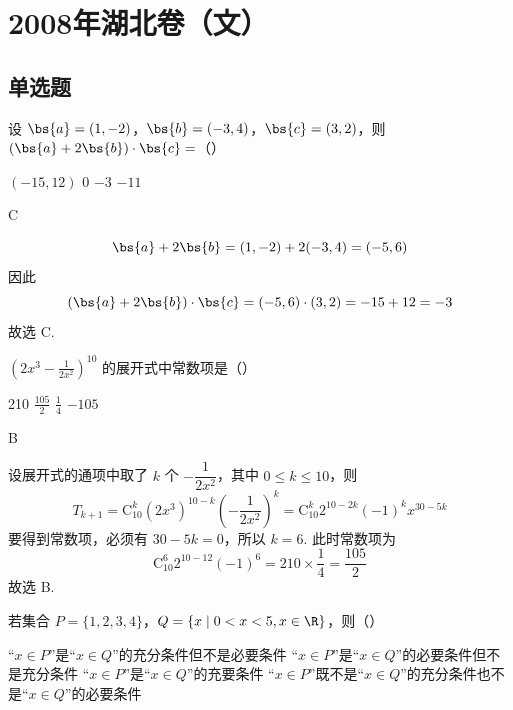\chapter{2008年湖北卷（文）}

\section{单选题}

\begin{problem}
设 \(\bs{a} = (1, -2)\)，\(\bs{b} = (-3, 4)\)，\(\bs{c} = (3, 2)\)，则 \((\bs{a} + 2\bs{b}) \cdot \bs{c} =\)（\quad）

\choices
    {\((-15, 12)\)}
    {0}
    {\(-3\)}
    {\(-11\)}
\end{problem}

\begin{answer}
C
\end{answer}

\begin{solution}
\[
\bs{a}+2\bs{b}=(1,-2)+2(-3,4)=(-5,6)
\]
因此
\[
(\bs{a}+2\bs{b})\cdot\bs{c}=(-5,6)\cdot(3,2)=-15+12=-3
\]
故选 C.
\end{solution}

\begin{problem}
\(\left(2x^{3} - \frac{1}{2x^{2}}\right)^{10}\) 的展开式中常数项是（\quad）

\choices
    {210}
    {\(\frac{105}{2}\)}
    {\(\frac{1}{4}\)}
    {\(-105\)}
\end{problem}

\begin{answer}
B
\end{answer}


\begin{solution}
设展开式的通项中取了 \(k\) 个 \(-\dfrac{1}{2x^2}\)，其中 \(0\leqslant k\leqslant10\)，则
\[
T_{k+1}=\mathrm C_{10}^{k}(2x^3)^{10-k}\left(-\frac{1}{2x^2}\right)^k
=\mathrm C_{10}^{k}2^{10-2k}(-1)^k x^{30-5k}
\]
要得到常数项，必须有 \(30-5k=0\)，所以 \(k=6\). 此时常数项为
\[
\mathrm C_{10}^{6}2^{10-12}(-1)^6
=210\times\frac{1}{4}=\frac{105}{2}
\]
故选 B.
\end{solution}

\begin{problem}
若集合 \(P = \{1, 2, 3, 4\}\)，\(Q = \{x \mid 0 < x < 5, x \in \R\}\)，则（\quad）

\choices
    {“\(x\in P\)”是“\(x\in Q\)”的充分条件但不是必要条件}
    {“\(x\in P\)”是“\(x\in Q\)”的必要条件但不是充分条件}
    {“\(x\in P\)”是“\(x\in Q\)”的充要条件}
    {“\(x\in P\)”既不是“\(x\in Q\)”的充分条件也不是“\(x\in Q\)”的必要条件}
\end{problem}

